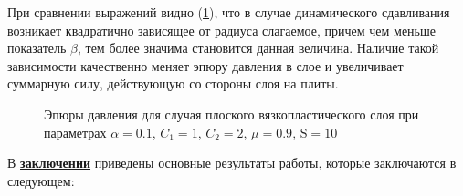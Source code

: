 При сравнении выражений видно (\cref{fig:ch4/sec4/pressure}), что в случае динамического сдавливания возникает квадратично зависящее от радиуса слагаемое, причем чем меньше показатель $\beta$, тем более значима становится данная величина. Наличие такой зависимости качественно меняет эпюру давления в слое и увеличивает суммарную силу, действующую со стороны слоя на плиты.
\begin{figure}[ht]
  \caption{Эпюры давления для случая плоского вязкопластического слоя при параметрах $\alpha=0.1$, $C_1=1$, $C_2=2$, $\mu=0.9$, $\text{S}=10$}
  \label{fig:ch4/sec4/pressure}
\end{figure}

\FloatBarrier
{}                                  %
В \underline{\textbf{заключении}} приведены основные результаты работы, которые заключаются в следующем:



